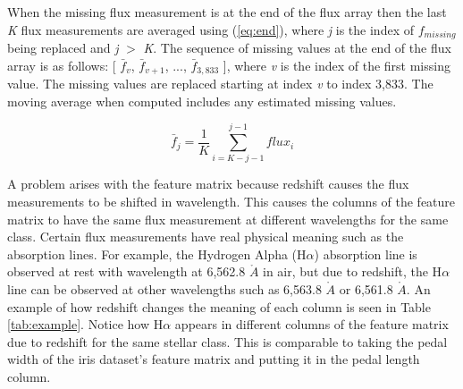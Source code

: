 \documentclass[conference]{IEEEtran}
\begin{document}
        When the missing flux measurement is at the end of the flux array then the last \textit{K} flux measurements are averaged using (\ref{eq:end}), where \textit{j} is the index of $f_{missing}$ being replaced and \textit{j} $>$ \textit{K}. The sequence of missing values at the end of the flux array is as follows: [ $\bar{f}_v$, $\bar{f}_{v+1}$, ..., $\bar{f}_{3,833}$ ], where \textit{v} is the index of the first missing value. The missing values are replaced starting at index \textit{v} to index 3,833. The moving average when computed includes any estimated missing values.
        
        \begin{equation}\label{eq:end}
            \bar{f}_j = \frac{1}{K} \sum_{i = K-j-1}^{j-1} flux_{i}
        \end{equation}
        
        
        A problem arises with the feature matrix because redshift causes the flux measurements to be shifted in wavelength. This causes the columns of the feature matrix to have the same flux measurement at different wavelengths for the same class. Certain flux measurements have real physical meaning such as the absorption lines. For example, the Hydrogen Alpha (H$\alpha$) absorption line is observed at rest with wavelength at 6,562.8 $\mathring{A}$ in air, but due to redshift, the H$\alpha$ line can be observed at other wavelengths such as 6,563.8 $\mathring{A}$ or 6,561.8 $\mathring{A}$. An example of how redshift changes the meaning of each column is seen in Table \ref{tab:example}. Notice how H$\alpha$ appears in different columns of the feature matrix due to redshift for the same stellar class. This is comparable to taking the pedal width of the iris dataset's \cite{Dua:2017} feature matrix and putting it in the pedal length column.  
        
\end{document}
